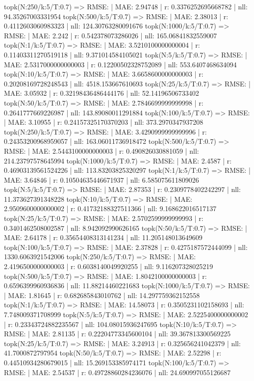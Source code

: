 topk(N:250/k:5/T:0.7) => RMSE: | MAE: 2.94748 | r: 0.3376252695668782 | nll: 94.35267003331954
topk(N:500/k:5/T:0.7) => RMSE: | MAE: 2.38013 | r: 0.4112603060983323 | nll: 124.30763280091676
topk(N:1000/k:5/T:0.7) => RMSE: | MAE: 2.242 | r: 0.542378073286026 | nll: 165.06841832559007
topk(N:1/k:5/T:0.7) => RMSE: | MAE: 3.5210100000000004 | r: 0.11403311270519118 | nll: 9.371014584105021
topk(N:5/k:5/T:0.7) => RMSE: | MAE: 2.5317000000000003 | r: 0.12200502328752089 | nll: 553.6407468634094
topk(N:10/k:5/T:0.7) => RMSE: | MAE: 3.6658600000000003 | r: 0.20208169728248543 | nll: 4518.153667610693
topk(N:25/k:5/T:0.7) => RMSE: | MAE: 3.05932 | r: 0.32198436486444176 | nll: 52.14196506733402
topk(N:50/k:5/T:0.7) => RMSE: | MAE: 2.7846699999999998 | r: 0.2641777669226987 | nll: 143.89080011291884
topk(N:100/k:5/T:0.7) => RMSE: | MAE: 3.10955 | r: 0.24157325170370203 | nll: 373.2970347937208
topk(N:250/k:5/T:0.7) => RMSE: | MAE: 3.4290999999999996 | r: 0.24353200968959057 | nll: 163.06011736918472
topk(N:500/k:5/T:0.7) => RMSE: | MAE: 2.5443100000000003 | r: 0.490826030881059 | nll: 214.23797578645994
topk(N:1000/k:5/T:0.7) => RMSE: | MAE: 2.4587 | r: 0.46903139561524226 | nll: 113.83203825320297
topk(N:1/k:5/T:0.7) => RMSE: | MAE: 3.64846 | r: 0.10504635446671937 | nll: 6.585075611809026
topk(N:5/k:5/T:0.7) => RMSE: | MAE: 2.87353 | r: 0.2309778402242297 | nll: 11.373627391348228
topk(N:10/k:5/T:0.7) => RMSE: | MAE: 2.9509600000000002 | r: 0.41732188327511366 | nll: 9.168622016517137
topk(N:25/k:5/T:0.7) => RMSE: | MAE: 2.5702599999999993 | r: 0.3401462508002587 | nll: 8.942092990626165
topk(N:50/k:5/T:0.7) => RMSE: | MAE: 2.64178 | r: 0.35654408313141234 | nll: 11.205148013649609
topk(N:100/k:5/T:0.7) => RMSE: | MAE: 2.37828 | r: 0.4275187572444099 | nll: 1330.6063921542006
topk(N:250/k:5/T:0.7) => RMSE: | MAE: 2.4196500000000003 | r: 0.6038140049920255 | nll: 9.116207328025219
topk(N:500/k:5/T:0.7) => RMSE: | MAE: 1.8042100000000003 | r: 0.6596399960936836 | nll: 11.88214460221683
topk(N:1000/k:5/T:0.7) => RMSE: | MAE: 1.81645 | r: 0.682685843010762 | nll: 14.297759362152558
topk(N:1/k:5/T:0.7) => RMSE: | MAE: 14.58073 | r: 0.3505231102158693 | nll: 7.748009371708999
topk(N:5/k:5/T:0.7) => RMSE: | MAE: 2.5225400000000002 | r: 0.23343724882235567 | nll: 104.08015936247695
topk(N:10/k:5/T:0.7) => RMSE: | MAE: 2.81135 | r: 0.22204773345600104 | nll: 39.367813300569225
topk(N:25/k:5/T:0.7) => RMSE: | MAE: 3.24913 | r: 0.325656241042379 | nll: 41.7000872797954
topk(N:50/k:5/T:0.7) => RMSE: | MAE: 2.52298 | r: 0.44510934280679015 | nll: 15.269153385974171
topk(N:100/k:5/T:0.7) => RMSE: | MAE: 2.54537 | r: 0.49728860284236076 | nll: 24.690997055126687
